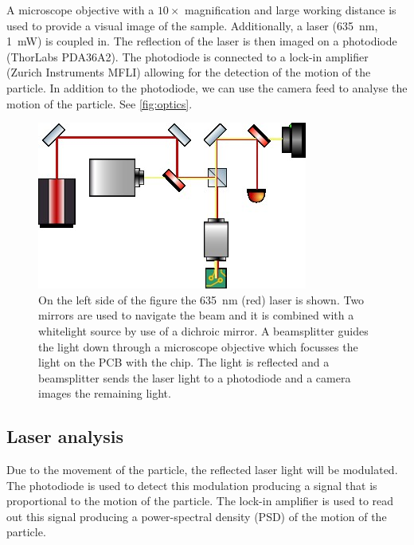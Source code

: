 A microscope objective with a $10\times$ magnification and large working distance is used to provide a visual image of the sample. Additionally, a laser (\qty{635}{\nm}, \qty{1}{\milli\watt}) is coupled in. The reflection of the laser is then imaged on a photodiode (ThorLabs PDA36A2). The photodiode is connected to a lock-in amplifier (Zurich Instruments MFLI) allowing for the detection of the motion of the particle. In addition to the photodiode, we can use the camera feed to analyse the motion of the particle. See \autoref{fig:optics}.

\begin{figure}
    \centering
    \includegraphics{figures/optics.jpg}
    \caption{On the left side of the figure the \qty{635}{\nm} (red) laser is shown. Two mirrors are used to navigate the beam and it is combined with a whitelight source by use of a dichroic mirror. A beamsplitter guides the light down through a microscope objective which focusses the light on the PCB with the chip. The light is reflected and a beamsplitter sends the laser light to a photodiode and a camera images the remaining light.}
    \label{fig:optics}
\end{figure}

\subsection{Laser analysis}
Due to the movement of the particle, the reflected laser light will be modulated. The photodiode is used to detect this modulation producing a signal that is proportional to the motion of the particle. The lock-in amplifier is used to read out this signal producing a power-spectral density (PSD) of the motion of the particle.

